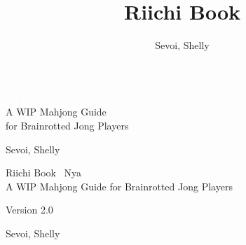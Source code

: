 \documentclass{book}
\title{Riichi Book}
\author{Sevoi, Shelly}
\newcommand{\theversion}{2.0}
\begin{document}
\frontmatter
{}

\thispagestyle{empty}


\begin{flushleft}

\vspace*{.24\paperheight}

\begin{spacing}{2.5}
\textcolor{White}{\fontsize{2.0cm}{3.3em}\scshape Rii Book ~Nya}\\
{\LARGE A WIP Mahjong Guide\\for Brainrotted Jong Players}
\end{spacing}

\vspace*{.08\paperheight}
\hfill {\LARGE Sevoi, Shelly}

\end{flushleft}

\restoregeometry


\thispagestyle{empty}
\mbox{}\newpage

\thispagestyle{empty}
\setcounter{page}{1}
\pagebreak
\onehalfspacing

\begin{flushright}

\vspace*{.18\paperheight}

\begin{spacing}{3}
{\Huge Riichi Book ~Nya}\\
{\Large A WIP Mahjong Guide for Brainrotted Jong Players}
\end{spacing}

\vspace*{.11\textheight} 

{\Large Version \theversion}\\

\vspace*{.07\textheight} 

{\Large
Sevoi, Shelly\\
}

\vfill

\end{flushright}

\pagebreak
\end{document}
